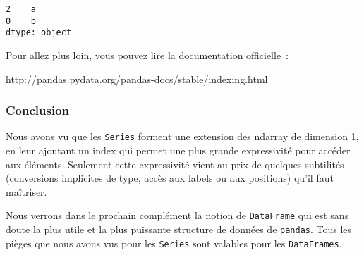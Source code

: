     \begin{Verbatim}[commandchars=\\\{\}]
2    a
0    b
dtype: object

    \end{Verbatim}

    Pour allez plus loin, vous pouvez lire la documentation officielle~:

http://pandas.pydata.org/pandas-docs/stable/indexing.html

    \hypertarget{conclusion}{%
\subsubsection{Conclusion}\label{conclusion}}

    Nous avons vu que les \texttt{Series} forment une extension des ndarray
de dimension 1, en leur ajoutant un index qui permet une plus grande
expressivité pour accéder aux éléments. Seulement cette expressivité
vient au prix de quelques subtilités (conversions implicites de type,
accès aux labels ou aux positions) qu'il faut maîtriser.

Nous verrons dans le prochain complément la notion de \texttt{DataFrame}
qui est sans doute la plus utile et la plus puissante structure de
données de \texttt{pandas}. Tous les pièges que nous avons vus pour les
\texttt{Series} sont valables pour les \texttt{DataFrames}.


    
    
    
